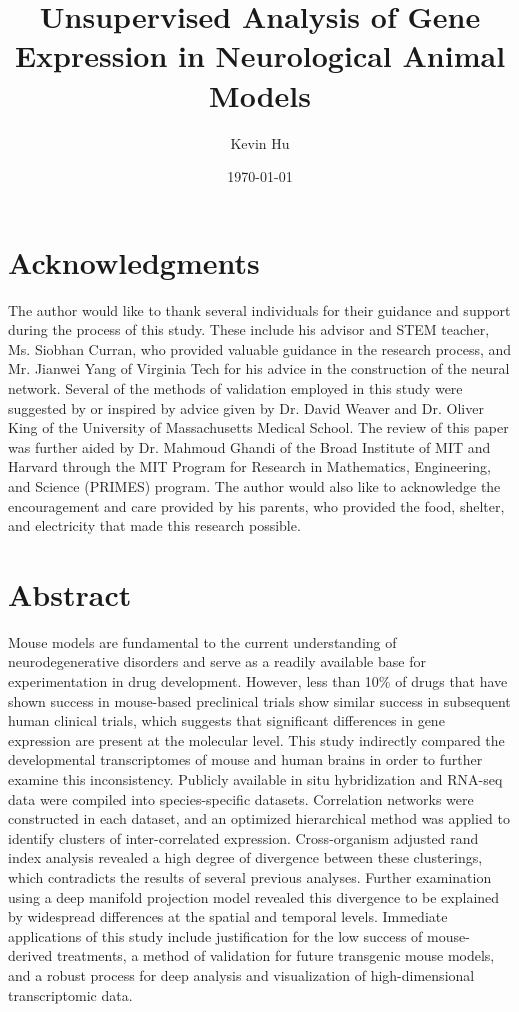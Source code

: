 \documentclass[12pt,oneside,onecolumn,a4paper]{article}
\title{\vspace{6cm}Unsupervised Analysis of Gene Expression in Neurological Animal Models}
\author{Kevin Hu}
\affil{Massachusetts Academy of Math and Science at WPI\vspace{-0.4cm}}
\date{\today}
\begin{document}
\maketitle
\thispagestyle{empty}

\clearpage

\break
\tableofcontents
\break

\section*{Acknowledgments}

The author would like to thank several individuals for their guidance and support during the process of this study. These include his advisor and STEM teacher, Ms. Siobhan Curran, who provided valuable guidance in the research process, and Mr. Jianwei Yang of Virginia Tech for his advice in the construction of the neural network. Several of the methods of validation employed in this study were suggested by or inspired by advice given by Dr. David Weaver and Dr. Oliver King of the University of Massachusetts Medical School. The review of this paper was further aided by Dr. Mahmoud Ghandi of the Broad Institute of MIT and Harvard through the MIT Program for Research in Mathematics, Engineering, and Science (PRIMES) program. The author would also like to acknowledge the encouragement and care provided by his parents, who provided the food, shelter, and electricity that made this research possible.

\break

\section{Abstract}

Mouse models are fundamental to the current understanding of neurodegenerative disorders and serve as a readily available base for experimentation in drug development. However, less than 10\% of drugs that have shown success in mouse-based preclinical trials show similar success in subsequent human clinical trials, which suggests that significant differences in gene expression are present at the molecular level. This study indirectly compared the developmental transcriptomes of mouse and human brains in order to further examine this inconsistency. Publicly available in situ hybridization and RNA-seq data were compiled into species-specific datasets. Correlation networks were constructed in each dataset, and an optimized hierarchical method was applied to identify clusters of inter-correlated expression. Cross-organism adjusted rand index analysis revealed a high degree of divergence between these clusterings, which contradicts the results of several previous analyses. Further examination using a deep manifold projection model revealed this divergence to be explained by widespread differences at the spatial and temporal levels. Immediate applications of this study include justification for the low success of mouse-derived treatments, a method of validation for future transgenic mouse models, and a robust process for deep analysis and visualization of high-dimensional transcriptomic data.
\end{document}
